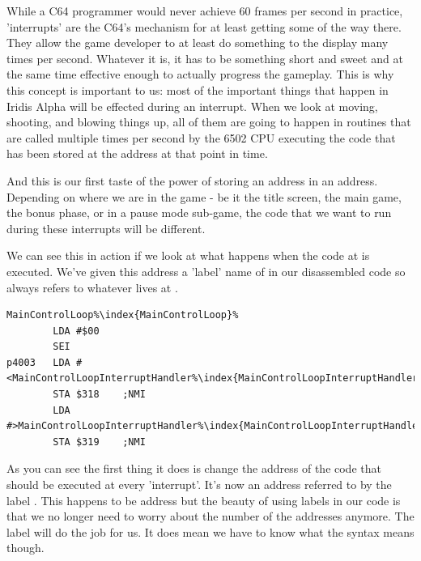 While a C64 programmer would never achieve 60 frames per second in practice, 'interrupts' are the C64's mechanism for at least
getting some of the way there. They allow the game developer to at least do something to the display many times per second.
Whatever it is, it has to be something short and sweet and at the same time effective enough to actually progress the gameplay.
This is why this concept is important to us: most of the important things that happen in Iridis Alpha will be effected during
an interrupt. When we look at moving, shooting, and blowing things up, all of them are going to happen in routines that are called
multiple times per second by the 6502 CPU executing the code that has been stored at the address  at that
point in time.

And this is our first taste of the power of storing an address in an address. Depending on where we are in the game - be it the
title screen, the main game, the bonus phase, or in a pause mode sub-game, the code that we want to run during these interrupts
will be different.

We can see this in action if we look at what happens when the code at  is executed. We've given this address 
a 'label' name of  in our disassembled code so  always refers to whatever lives at
. 

\begin{lstlisting}[caption=The code at \icode{\$4000}. ,escapechar=\%]
MainControlLoop%\index{MainControlLoop}%
        LDA #$00
        SEI
p4003   LDA #<MainControlLoopInterruptHandler%\index{MainControlLoopInterruptHandler}%
        STA $318    ;NMI
        LDA #>MainControlLoopInterruptHandler%\index{MainControlLoopInterruptHandler}%
        STA $319    ;NMI
\end{lstlisting}

As you can see the first thing it does is change the address of the code that should be executed at every 'interrupt'. It's now an
address referred to by the label . This happens to be address  but the beauty
of using labels in our code is that we no longer need to worry about the number of the addresses anymore. The label will do the job
for us. It does mean we have to know what the syntax  means though.

